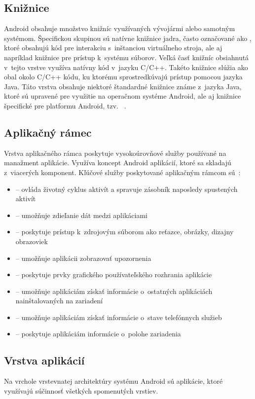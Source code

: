 \subsection{Knižnice}
Android obsahuje množstvo knižníc využívaných vývojármi alebo samotným systémom. Špecifickou skupinou sú natívne knižnice jadra, často označované ako , ktoré obsahujú kód pre interakciu s~inštanciou virtuálneho stroja, ale aj napríklad knižnice pre prístup k~systému súborov. Veľká časť knižníc obsiahnutá v~tejto vrstve využíva natívny kód v~jazyku C/C++. Takéto knižnice slúžia ako obal okolo C/C++ kódu, ku ktorému  sprostredkúvajú prístup pomocou jazyka Java. Táto vrstva obsahuje niektoré štandardné knižnice známe z~jazyka Java, ktoré sú upravené pre využitie na operačnom systéme Android, ale aj knižnice špecifické pre platformu Android, tzv. ~\cite{architecture}.
\subsection{Aplikačný rámec}
Vrstva aplikačného rámca poskytuje vysokoúrovňové služby používané na manažment aplikácie. Využíva koncept Android aplikácií, ktoré sa skladajú z~viacerých komponent. Kľúčové služby poskytované aplikačným rámcom sú~\cite{architecture}: 
\begin{itemize}
	\item {}  --  ovláda životný cyklus aktivít a spravuje zásobník naposledy spustených aktivít
	\item {}  --  umožňuje zdieľanie dát medzi aplikáciami
	\item {}  --  poskytuje prístup k~zdrojovým súborom ako reťazce, obrázky, dizajny obrazoviek
	\item {}  --  umožňuje aplikácii zobrazovať upozornenia
	\item {}  --  poskytuje prvky grafického používateľského rozhrania aplikácie
	\item {}  --  umožňuje aplikáciám získať informácie o~ostatných aplikáciách nainštalovaných na zariadení
	\item {}  --  umožňuje aplikáciám získať informácie o~stave telefónnych služieb
	\item {}  --  poskytuje aplikáciám informácie o~polohe zariadenia
\end{itemize}
\subsection{Vrstva aplikácií}
Na vrchole vrstevnatej architektúry systému Android sú aplikácie, ktoré využívajú súčinnosť všetkých spomenutých vrstiev. 

